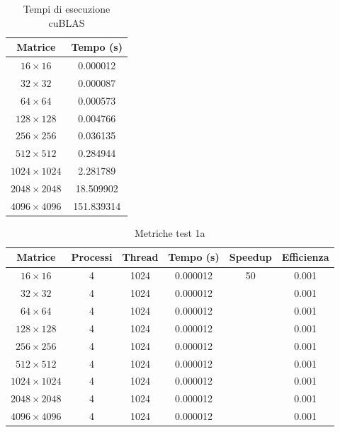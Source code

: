 \begin{table}[h]
    \centering
    \begin{tabular}{cc}
        \hline
        \textbf{Matrice}    & \textbf{Tempo (s)} \\ \hline
        $16   \times 16   $ & 0.000012           \\
        $32   \times 32   $ & 0.000087           \\
        $64   \times 64   $ & 0.000573           \\
        $128  \times 128  $ & 0.004766           \\
        $256  \times 256  $ & 0.036135           \\
        $512  \times 512  $ & 0.284944           \\
        $1024 \times 1024 $ & 2.281789           \\
        $2048 \times 2048 $ & 18.509902          \\
        $4096 \times 4096 $ & 151.839314         \\ \hline
    \end{tabular}
    \caption{Tempi di esecuzione cuBLAS}
\end{table}

\begin{table}[h]
    \centering
    \begin{tabular}{cccccc}
        \hline
        \textbf{Matrice}    & \textbf{Processi} & \textbf{Thread} & \textbf{Tempo (s)} & \textbf{Speedup} & \textbf{Efficienza} \\ \hline
        $16   \times 16   $ & 4                 & 1024            & 0.000012           & 50               & 0.001               \\
        $32   \times 32   $ & 4                 & 1024            & 0.000012           &                  & 0.001               \\
        $64   \times 64   $ & 4                 & 1024            & 0.000012           &                  & 0.001               \\
        $128  \times 128  $ & 4                 & 1024            & 0.000012           &                  & 0.001               \\
        $256  \times 256  $ & 4                 & 1024            & 0.000012           &                  & 0.001               \\
        $512  \times 512  $ & 4                 & 1024            & 0.000012           &                  & 0.001               \\
        $1024 \times 1024 $ & 4                 & 1024            & 0.000012           &                  & 0.001               \\
        $2048 \times 2048 $ & 4                 & 1024            & 0.000012           &                  & 0.001               \\
        $4096 \times 4096 $ & 4                 & 1024            & 0.000012           &                  & 0.001               \\ \hline
    \end{tabular}
    \caption{Metriche test 1a}
\end{table}

